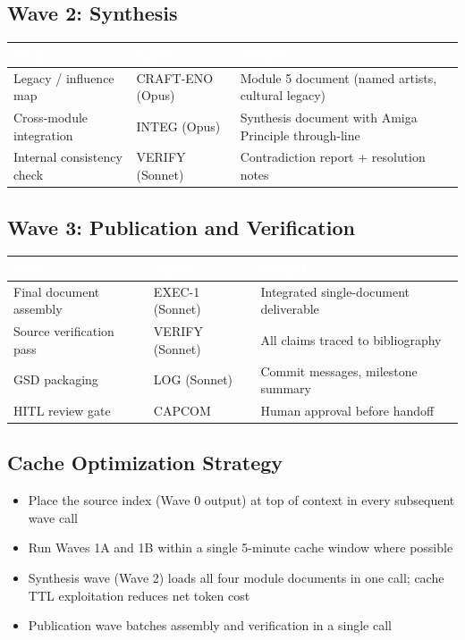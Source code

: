 \documentclass[11pt,letterpaper]{article}
\newcommand{\tableheader}[1]{\textbf{\sffamily\textcolor{white}{#1}}}
\begin{document}
\subsection{Wave 2: Synthesis}

\begin{center}
\begin{tabularx}{\textwidth}{L{3.5cm}L{2.5cm}X}
\toprule
{}
\tableheader{Task} & \tableheader{Agent} & \tableheader{Output} \\
\midrule
Legacy / influence map & CRAFT-ENO (Opus) & Module 5 document (named artists, cultural legacy) \\
Cross-module integration & INTEG (Opus) & Synthesis document with Amiga Principle through-line \\
Internal consistency check & VERIFY (Sonnet) & Contradiction report + resolution notes \\
\bottomrule
\end{tabularx}
\end{center}

\subsection{Wave 3: Publication and Verification}

\begin{center}
\begin{tabularx}{\textwidth}{L{3.5cm}L{2.5cm}X}
\toprule
{}
\tableheader{Task} & \tableheader{Agent} & \tableheader{Output} \\
\midrule
Final document assembly & EXEC-1 (Sonnet) & Integrated single-document deliverable \\
Source verification pass & VERIFY (Sonnet) & All claims traced to bibliography \\
GSD packaging & LOG (Sonnet) & Commit messages, milestone summary \\
HITL review gate & CAPCOM & Human approval before handoff \\
\bottomrule
\end{tabularx}
\end{center}

\subsection{Cache Optimization Strategy}

\begin{itemize}[leftmargin=*]
  \item Place the source index (Wave 0 output) at top of context in every subsequent wave call
  \item Run Waves 1A and 1B within a single 5-minute cache window where possible
  \item Synthesis wave (Wave 2) loads all four module documents in one call; cache TTL exploitation reduces net token cost
  \item Publication wave batches assembly and verification in a single call
\end{itemize}
\end{document}
